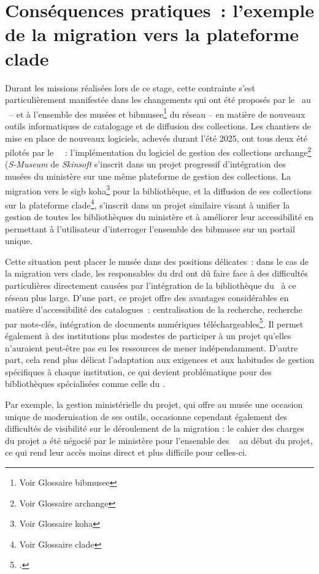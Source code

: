 \section{\label{I-B-2}Conséquences pratiques~: l'exemple de la migration vers la plateforme \acs{clade}}

Durant les missions réalisées lors de ce stage, cette contrainte s'est particulièrement manifestée dans les changements qui ont été proposés par le \minarm~au \mae~-- et à l'ensemble des musées et \gls{bibmusee}\footnote{Voir Glossaire \gls{bibmusee}} du réseau -- en matière de nouveaux outils informatiques de catalogage et de diffusion des collections. Les chantiers de mise en place de nouveaux logiciels, achevés durant l'été 2025, ont tous deux été pilotés par le \minarm~~: l'implémentation du logiciel de gestion des collections \gls{archange}\footnote{Voir Glossaire \gls{archange}} (\textit{S-Museum} de \textit{Skinsoft} s'inscrit dans un projet progressif d'intégration des musées du ministère sur une même plateforme de gestion des collections. La migration vers le \acf{sigb} \gls{koha}\footnote{Voir Glossaire \gls{koha}} pour la bibliothèque, et la diffusion de ses collections sur la plateforme \gls{clade}\footnote{Voir Glossaire \gls{clade}}, s'inscrit dans un projet similaire visant à unifier la gestion de toutes les bibliothèques du ministère et à améliorer leur accessibilité en permettant à l'utilisateur d'interroger l'ensemble des \gls{bibmusee} sur un portail unique.

Cette situation peut placer le musée dans des positions délicates~: dans le cas de la migration vers \gls{clade}, les responsables du \ac{drd} ont dû faire face à des difficultés particulières directement causées par l'intégration de la bibliothèque du \mae~à ce réseau plus large. D'une part, ce projet offre des avantages considérables en matière d'accessibilité des catalogues~: centralisation de la recherche, recherche par mots-clés, intégration de documents numériques téléchargeables\footcite{ministeredesarmeesKitCommunicationCLADE}. Il permet également à des institutions plus modestes de participer à un projet qu'elles n'auraient peut-être pas eu les ressources de mener indépendamment. D'autre part, cela rend plus délicat l'adaptation aux exigences et aux habitudes de gestion spécifiques à chaque institution, ce qui devient problématique pour des bibliothèques spécialisées comme celle du \mae.

Par exemple, la gestion ministérielle du projet, qui offre au musée une occasion unique de modernisation de ses outils, occasionne cependant également des difficultés de visibilité sur le déroulement de la migration : le cahier des charges du projet a été négocié par le ministère pour l'ensemble des \bibmusee~ au début du projet, ce qui rend leur accès moins direct et plus difficile pour celles-ci.

